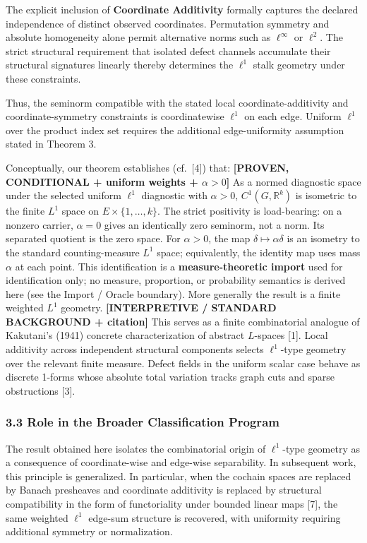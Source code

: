 \documentclass[
  11pt,
]{article}
\begin{document}
The explicit inclusion of \textbf{Coordinate Additivity} formally
captures the declared independence of distinct observed coordinates.
Permutation symmetry and absolute homogeneity alone permit alternative
norms such as \(\ell^\infty\) or \(\ell^2\). The strict structural
requirement that isolated defect channels accumulate their structural
signatures linearly thereby determines the \(\ell^1\) stalk geometry
under these constraints.

Thus, the seminorm compatible with the stated local
coordinate-additivity and coordinate-symmetry constraints is
coordinatewise \(\ell^1\) on each edge. Uniform \(\ell^1\) over the
product index set requires the additional edge-uniformity assumption
stated in Theorem 3.

Conceptually, our theorem establishes (cf.~{[}4{]}) that:
\textbf{{[}PROVEN, CONDITIONAL + uniform weights + \(\alpha>0\){]}} As a
normed diagnostic space under the selected uniform \(\ell^1\) diagnostic
with \(\alpha>0\), \(C^1(G,\mathbb R^k)\) is isometric to the finite
\(L^1\) space on \(E\times\{1,\dots,k\}\). The strict positivity is
load-bearing: on a nonzero carrier, \(\alpha=0\) gives an identically
zero seminorm, not a norm. Its separated quotient is the zero space. For
\(\alpha>0\), the map \(\delta\mapsto\alpha\delta\) is an isometry to
the standard counting-measure \(L^1\) space; equivalently, the identity
map uses mass \(\alpha\) at each point. This identification is a
\textbf{measure-theoretic import} used for identification only; no
measure, proportion, or probability semantics is derived here (see the
Import / Oracle boundary). More generally the result is a finite
weighted \(L^1\) geometry. \textbf{{[}INTERPRETIVE / STANDARD BACKGROUND
+ citation{]}} This serves as a finite combinatorial analogue of
Kakutani's (1941) concrete characterization of abstract \(L\)-spaces
{[}1{]}. Local additivity across independent structural components
selects \(\ell^1\)-type geometry over the relevant finite measure.
Defect fields in the uniform scalar case behave as discrete 1-forms
whose absolute total variation tracks graph cuts and sparse obstructions
{[}3{]}.

\hypertarget{role-in-the-broader-classification-program}{%
\subsubsection{3.3 Role in the Broader Classification
Program}\label{role-in-the-broader-classification-program}}

The result obtained here isolates the combinatorial origin of
\(\ell^1\)-type geometry as a consequence of coordinate-wise and
edge-wise separability. In subsequent work, this principle is
generalized. In particular, when the cochain spaces are replaced by
Banach presheaves and coordinate additivity is replaced by structural
compatibility in the form of functoriality under bounded linear maps
{[}7{]}, the same weighted \(\ell^1\) edge-sum structure is recovered,
with uniformity requiring additional symmetry or normalization.
\end{document}
